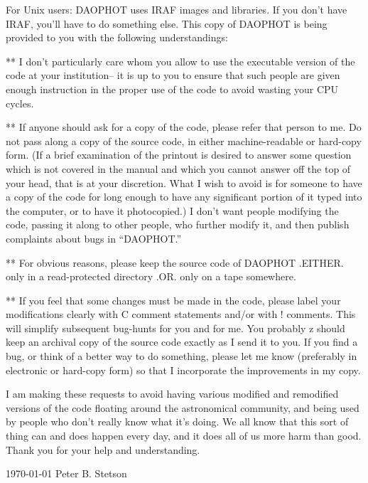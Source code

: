 For Unix users:  DAOPHOT uses IRAF images and libraries.  If you don't
have IRAF, you'll have to do something else.
\vfill
\eject
\noindent This copy of DAOPHOT is being provided to you with the following
understandings:

\item{**}  I don't particularly care whom you allow to use the
executable version of the code at your institution-- it is up to
you to ensure that such people are given enough instruction in the
proper use of the code to avoid wasting your CPU cycles. 

\item{**}  If anyone should ask for a copy of the code, please refer
that person to me.  Do not pass along a copy of the source code, in 
either machine-readable or hard-copy form.  (If a brief examination
of the printout is desired to answer some question which is not
covered in the manual and which you cannot answer off the top of 
your head, that is at your discretion.  What I wish to avoid is for
someone to have a copy of the code for long enough to have any
significant portion of it typed into the computer, or to have it 
photocopied.)  I don't want people modifying the code, passing it along
to other people, who further modify it, and then publish complaints 
about bugs in ``DAOPHOT.''

\item{**}  For obvious reasons, please keep the source code of DAOPHOT
.EITHER. only in a read-protected directory .OR. only on a tape
somewhere. 

\item{**}  If you feel that some changes must be made in the code, 
please label your modifications clearly with C comment statements 
and/or with     ! comments.  This will simplify subsequent bug-hunts
for you and for me.  You probably z    should keep an archival copy of 
the source code exactly as I send it to you.  If you find a bug, or 
think of a better way to do something, please let me know (preferably 
in electronic or hard-copy form) so that I incorporate the improvements
in my copy.

\noindent I am making these requests to avoid having various modified
and remodified versions of the code floating around the astronomical
community, and being used by people who don't really know what it's
doing.  We all know that this sort of thing can and does happen every
day, and it does all of us more harm than good.  Thank you for your
help and understanding.

\vfill
\indent \today
\vfill
\indent Peter B. Stetson 

